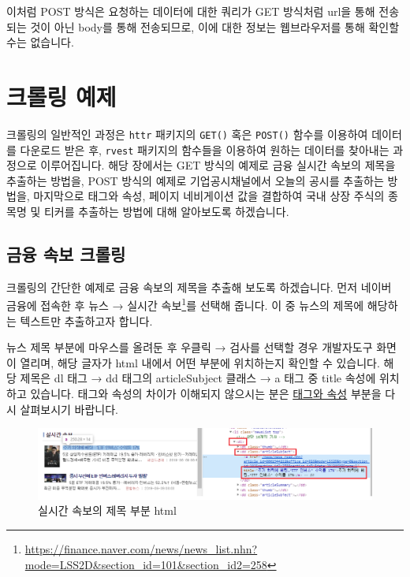 \documentclass[]{book}
\let\rmarkdownfootnote\footnote%
\def\footnote{\protect\rmarkdownfootnote}
\begin{document}
이처럼 POST 방식은 요청하는 데이터에 대한 쿼리가 GET 방식처럼 url을 통해 전송되는 것이 아닌 body를 통해 전송되므로, 이에 대한 정보는 웹브라우저를 통해 확인할 수는 없습니다.

\hypertarget{section-13}{%
\section{크롤링 예제}\label{section-13}}

크롤링의 일반적인 과정은 \texttt{httr} 패키지의 \texttt{GET()} 혹은 \texttt{POST()} 함수를 이용하여 데이터를 다운로드 받은 후, \texttt{rvest} 패키지의 함수들을 이용하여 원하는 데이터를 찾아내는 과정으로 이루어집니다. 해당 장에서는 GET 방식의 예제로 금융 실시간 속보의 제목을 추출하는 방법을, POST 방식의 예제로 기업공시채널에서 오늘의 공시를 추출하는 방법을, 마지막으로 태그와 속성, 페이지 네비게이션 값을 결합하여 국내 상장 주식의 종목명 및 티커를 추출하는 방법에 대해 알아보도록 하겠습니다.

\hypertarget{section-14}{%
\subsection{금융 속보 크롤링}\label{section-14}}

크롤링의 간단한 예제로 금융 속보의 제목을 추출해 보도록 하겠습니다. 먼저 네이버 금융에 접속한 후 뉴스 → 실시간 속보\footnote{\url{https://finance.naver.com/news/news_list.nhn?mode=LSS2D\&section_id=101\&section_id2=258}}를 선택해 줍니다. 이 중 뉴스의 제목에 해당하는 텍스트만 추출하고자 합니다.

뉴스 제목 부분에 마우스를 올려둔 후 우클릭 → 검사를 선택할 경우 개발자도구 화면이 열리며, 해당 글자가 html 내에서 어떤 부분에 위치하는지 확인할 수 있습니다. 해당 제목은 dl 태그 → dd 태그의 articleSubject 클래스 → a 태그 중 title 속성에 위치하고 있습니다. 태그와 속성의 차이가 이해되지 않으시는 분은 \protect\hyperlink{section-7}{태그와 속성} 부분을 다시 살펴보시기 바랍니다.

\begin{figure}

{\centering \includegraphics[width=1\linewidth]{images/crawl_naver_news} 

}

\caption{실시간 속보의 제목 부분 html}\label{fig:unnamed-chunk-7}
\end{figure}
\end{document}
